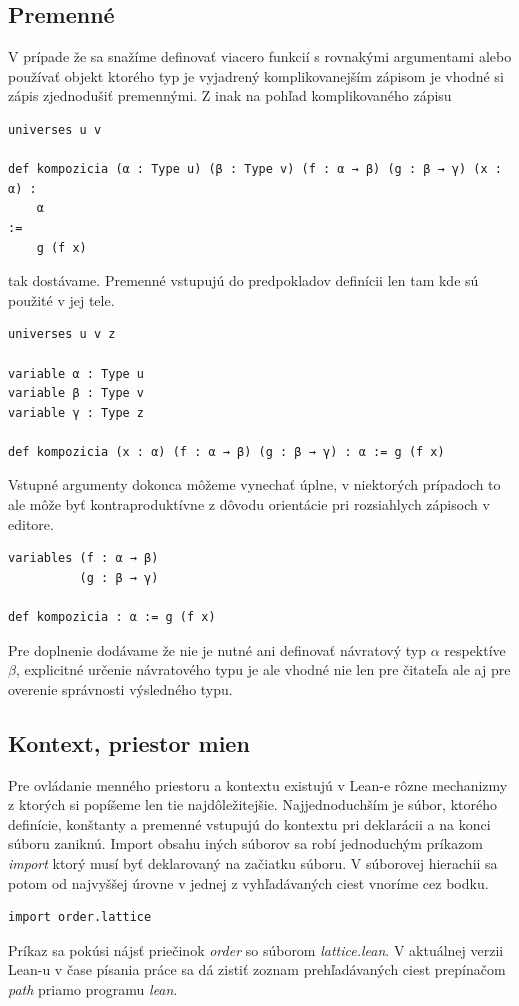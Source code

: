 \documentclass[a4paper,10pt,oneside]{report}%
\begin{document}
\subsection{Premenné}
    V prípade že sa snažíme definovať viacero funkcií s rovnakými argumentami alebo
používať objekt ktorého typ je vyjadrený komplikovanejším zápisom je vhodné si
zápis zjednodušiť premennými.
    Z inak na pohľad komplikovaného zápisu
\begin{lstlisting}
universes u v

def kompozicia (α : Type u) (β : Type v) (f : α → β) (g : β → γ) (x : α) :
    α
:=
    g (f x)
\end{lstlisting}
    tak dostávame.
    Premenné vstupujú do predpokladov definícii len tam kde sú použité v jej tele.
\begin{lstlisting}
universes u v z

variable α : Type u
variable β : Type v
variable γ : Type z

def kompozicia (x : α) (f : α → β) (g : β → γ) : α := g (f x)
\end{lstlisting}
    Vstupné argumenty dokonca môžeme vynechať úplne, v niektorých prípadoch to ale
môže byť kontraproduktívne z dôvodu orientácie pri rozsiahlych zápisoch v editore.
\begin{lstlisting}
variables (f : α → β)
          (g : β → γ)

def kompozicia : α := g (f x)
\end{lstlisting}
Pre doplnenie dodávame že nie je nutné ani definovať návratový typ $\alpha$
    respektíve $\beta$, explicitné určenie návratového typu je ale vhodné nie len
    pre čitateľa ale aj pre overenie správnosti výsledného typu.
\subsection{Kontext, priestor mien}
    Pre ovládanie menného priestoru a kontextu existujú v Lean-e rôzne mechanizmy
z ktorých si popíšeme len tie najdôležitejšie.
    Najjednoduchším je súbor, ktorého definície, konštanty a premenné vstupujú do
kontextu pri deklarácii a na konci súboru zaniknú.
    Import obsahu iných súborov sa robí jednoduchým príkazom \emph{import} ktorý
musí byť deklarovaný na začiatku súboru. V súborovej hierachii sa potom od najvyššej
úrovne v jednej z vyhľadávaných ciest vnoríme cez bodku.
\begin{lstlisting}
import order.lattice
\end{lstlisting}
    Príkaz sa pokúsi nájsť priečinok \emph{order} so súborom \emph{lattice.lean}.
    V aktuálnej verzii Lean-u v čase písania práce sa dá zistiť zoznam prehľadávaných
ciest prepínačom \emph{path} priamo programu \emph{lean}.
\end{document}

